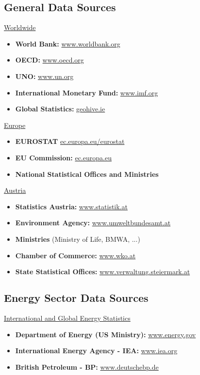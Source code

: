\subsection{General Data Sources}
\label{sec:generalDataSources}

\underline{Worldwide}
\begin{itemize}
    \item \textbf{World Bank:} \url{www.worldbank.org}
    \item \textbf{OECD:} \url{www.oecd.org}
    \item \textbf{UNO:} \url{www.un.org}
    \item \textbf{International Monetary Fund:} \url{www.imf.org}
    \item \textbf{Global Statistics:} \url{geohive.ie}
\end{itemize}

\underline{Europe}
\begin{itemize}
    \item \textbf{EUROSTAT} \url{ec.europa.eu/eurostat}
    \item \textbf{EU Commission:} \url{ec.europa.eu}
    \item \textbf{National Statistical Offices and Ministries}
\end{itemize}

\underline{Austria}
\begin{itemize}
    \item \textbf{Statistics Austria:} \url{www.statistik.at}
    \item \textbf{Environment Agency:} \url{www.umweltbundesamt.at}
    \item \textbf{Ministries} (Ministry of Life, BMWA, ...)
    \item \textbf{Chamber of Commerce:} \url{www.wko.at}
    \item \textbf{State Statistical Offices:} \url{www.verwaltung.steiermark.at}
\end{itemize}


\subsection{Energy Sector Data Sources}
\label{sec:energySectorDataSourcesWorldwide}

\underline{International and Global Energy Statistics}
\begin{itemize}
    \item \textbf{Department of Energy (US Ministry):} \url{www.energy.gov}
    \item \textbf{International Energy Agency - IEA:} \url{www.iea.org}
    \item \textbf{British Petroleum - BP:} \url{www.deutschebp.de}
\end{itemize}


